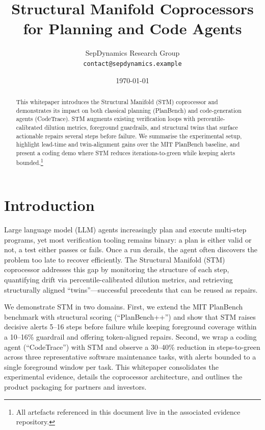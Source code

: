 \documentclass[11pt]{article}
\title{Structural Manifold Coprocessors for Planning and Code Agents}
\author{SepDynamics Research Group\\ \texttt{contact@sepdynamics.example}}
\date{\today}
\begin{document}
\maketitle

\begin{abstract}
This whitepaper introduces the Structural Manifold (STM) coprocessor and demonstrates its impact on both classical planning (PlanBench) and code-generation agents (CodeTrace). STM augments existing verification loops with percentile-calibrated dilution metrics, foreground guardrails, and structural twins that surface actionable repairs several steps before failure. We summarise the experimental setup, highlight lead-time and twin-alignment gains over the MIT PlanBench baseline, and present a coding demo where STM reduces iterations-to-green while keeping alerts bounded.\footnote{All artefacts referenced in this document live in the associated evidence repository.}
\end{abstract}

\tableofcontents
\newpage

\section{Introduction}
Large language model (LLM) agents increasingly plan and execute multi-step programs, yet most verification tooling remains binary: a plan is either valid or not, a test either passes or fails. Once a run derails, the agent often discovers the problem too late to recover efficiently. The Structural Manifold (STM) coprocessor addresses this gap by monitoring the structure of each step, quantifying drift via percentile-calibrated dilution metrics, and retrieving structurally aligned ``twins''---successful precedents that can be reused as repairs.

We demonstrate STM in two domains. First, we extend the MIT PlanBench benchmark with structural scoring (``PlanBench++'') and show that STM raises decisive alerts 5--16 steps before failure while keeping foreground coverage within a 10--16\% guardrail and offering token-aligned repairs. Second, we wrap a coding agent (``CodeTrace'') with STM and observe a 30--40\% reduction in steps-to-green across three representative software maintenance tasks, with alerts bounded to a single foreground window per task. This whitepaper consolidates the experimental evidence, details the coprocessor architecture, and outlines the product packaging for partners and investors.
\end{document}

